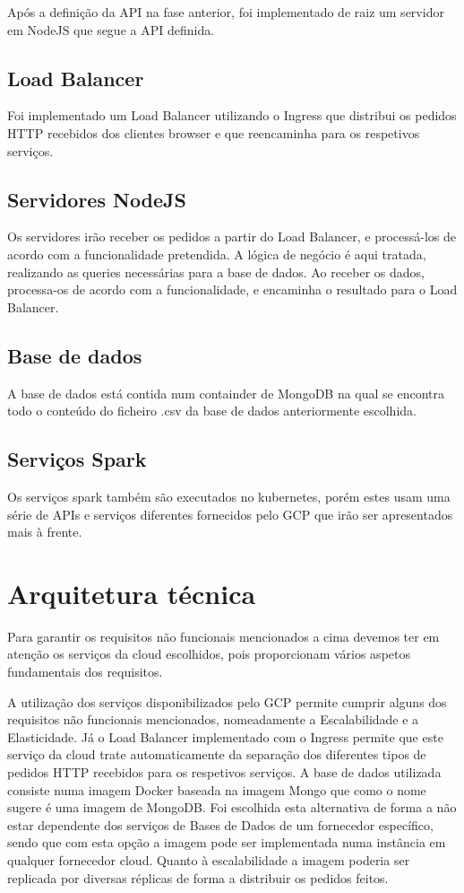 \documentclass[11pt,a4paper]{article}
\begin{document}
Após a definição da API na fase anterior, foi implementado de raiz um servidor em NodeJS que segue a API definida.


\subsection{Load Balancer}
Foi implementado um Load Balancer utilizando o Ingress que distribui os pedidos HTTP recebidos dos clientes browser e que reencaminha para os respetivos serviços.

\subsection{Servidores NodeJS}
Os servidores irão receber os pedidos a partir do Load Balancer, e processá-los de acordo com a funcionalidade pretendida. A lógica de negócio é aqui tratada, realizando as queries necessárias para a base de dados. Ao receber os dados, processa-os de acordo com a funcionalidade, e encaminha o resultado para o Load Balancer.

\subsection{Base de dados}
A base de dados está contida num containder de MongoDB na qual se encontra todo o conteúdo do ficheiro .csv da base de dados anteriormente escolhida.

\subsection{Serviços Spark}
Os serviços spark também são executados no kubernetes, porém estes usam uma série de APIs e serviços diferentes fornecidos pelo GCP que irão ser apresentados mais à frente.

\section{Arquitetura técnica}
Para garantir os requisitos não funcionais mencionados a cima devemos ter em atenção os serviços da cloud escolhidos, pois proporcionam vários aspetos fundamentais dos requisitos.
\newline

A utilização dos serviços disponibilizados pelo GCP permite cumprir alguns dos requisitos não funcionais mencionados, nomeadamente a Escalabilidade e a Elasticidade. Já o Load Balancer implementado com o Ingress permite que este serviço da cloud trate automaticamente da separação dos diferentes tipos de pedidos HTTP recebidos para os respetivos serviços. A base de dados utilizada consiste numa imagem Docker baseada na imagem Mongo que como o nome sugere é uma imagem de MongoDB. Foi escolhida esta alternativa de forma a não estar dependente dos serviços de Bases de Dados de um fornecedor específico, sendo que com esta opção a imagem pode ser implementada numa instância em qualquer fornecedor cloud. Quanto à escalabilidade a imagem poderia ser replicada por diversas réplicas de forma a distribuir os pedidos feitos.
\newline
\end{document}
